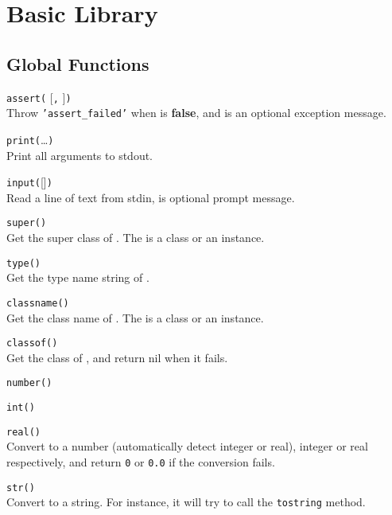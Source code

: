 \section*{Basic Library}

\subsection*{Global Functions}

\hangpar \texttt{assert(} [\texttt{,} ]\texttt{)}\\
Throw \texttt{'assert\_failed'} when  is \textbf{false}, and  is an optional exception message.

\hangpar \texttt{print(}\dots\texttt{)}\\
Print all arguments to stdout.

\hangpar \texttt{input(}[]\texttt{)}\\
Read a line of text from stdin,  is optional prompt message.

\hangpar \texttt{super(}\texttt{)}\\
Get the super class of . The  is a class or an instance.

\hangpar \texttt{type(}\texttt{)}\\
Get the type name string of .

\hangpar \texttt{classname(}\texttt{)}\\
Get the class name of . The  is a class or an instance.

\hangpar \texttt{classof(}\texttt{)}\\
Get the class of , and return nil when it fails.

\hangpar \texttt{number(}\texttt{)}

\hangpar \texttt{int(}\texttt{)}

\hangpar \texttt{real(}\texttt{)}\\
Convert  to a number (automatically detect integer or real), integer or real respectively, and return \texttt{0} or \texttt{0.0} if the conversion fails.

\hangpar \texttt{str(}\texttt{)}\\
Convert  to a string. For instance, it will try to call the \texttt{tostring} method.

